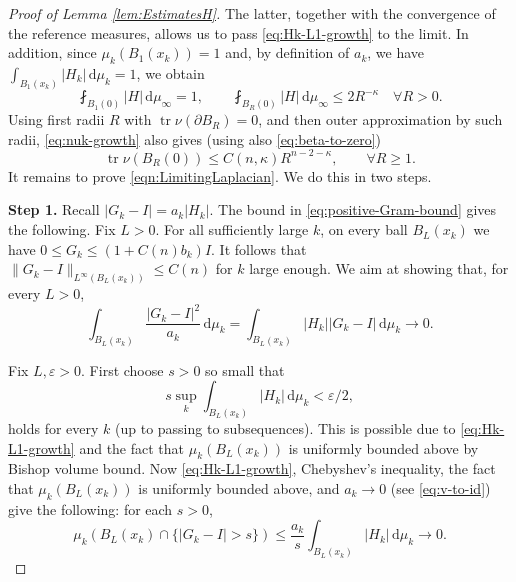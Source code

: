 \documentclass[12pt,a4paper,reqno]{amsart}
\renewcommand{\leq}{\leqslant}
\renewcommand{\geq}{\geqslant}
\renewcommand{\epsilon}{\varepsilon}
\newcommand{\tr}{\operatorname{tr}}
\begin{document}
\begin{proof}[Proof of Lemma \ref{lem:EstimatesH}]
The latter, together with the convergence of the reference measures, allows us to pass
\eqref{eq:Hk-L1-growth} to the limit. In addition, since
$\mu_k(B_1(x_k))=1$ and, by definition of $a_k$, we have
 $\int_{B_1(x_k)}|H_k|\,\mathrm{d}\mu_k=1$,
we obtain
\begin{equation}\label{eq:H-limit-growth}
 \fint_{B_1(0)}|H|\,\mathrm{d}\mu_\infty=1,
 \qquad
 \fint_{B_R(0)}|H|\,\mathrm{d}\mu_\infty\leq 2R^{-\kappa}
 \quad \forall R>0.
\end{equation}
Using first radii $R$ with $\tr\nu(\partial B_R)=0$, and then outer
approximation by such radii,
\eqref{eq:nuk-growth} also gives (using also \eqref{eq:beta-to-zero})
\begin{equation}\label{eq:nu-limit-growth}
 \tr\nu(B_R(0))\leq C(n,\kappa)R^{n-2-\kappa},
 \qquad\forall R\geq1.
\end{equation}
It remains to prove \eqref{eqn:LimitingLaplacian}. We do this in two steps.
\smallskip

\textbf{Step 1.} Recall $
|G_k-I|=a_k|H_k|$.
The bound in \eqref{eq:positive-Gram-bound} gives the following. Fix $L>0$. For all sufficiently large $k$, on every ball
$B_L(x_k)$ we have $
 0\leq G_k\leq(1+C(n)b_k)I$. 
It follows that $\|G_k-I\|_{L^\infty(B_L(x_k))}\leq C(n)$ for $k$ large enough. We aim at showing that, for every $L>0$,
\begin{equation}\label{eq:quadratic-remainderPre}
 \int_{B_L(x_k)}\frac{|G_k-I|^2}{a_k}\,\mathrm{d}\mu_k
 =\int_{B_L(x_k)}|H_k||G_k-I|\,\mathrm{d}\mu_k
 \to 0.
\end{equation}

Fix $L,\epsilon>0$.  
First choose $s>0$
so small that
\begin{equation}\label{eqn:varepsilon}
 s\sup_k\int_{B_L(x_k)}|H_k|\,\mathrm{d}\mu_k<\epsilon/2,
\end{equation}
holds for every $k$ (up to passing to subsequences). This is possible due to \eqref{eq:Hk-L1-growth} and the fact that $\mu_k(B_L(x_k))$ is uniformly bounded above by Bishop volume bound. Now \eqref{eq:Hk-L1-growth}, Chebyshev's inequality, the fact that $\mu_k(B_L(x_k))$ is uniformly bounded above, and $a_k\to 0$ (see \eqref{eq:v-to-id})
give the following: for each $s>0$,
\begin{equation}\label{eq:F-in-measure}
 \mu_k\left(B_L(x_k)\cap\{|G_k-I|>s\}\right)
 \leq\frac{a_k}{s}\int_{B_L(x_k)}|H_k|\,\mathrm{d}\mu_k
 \to 0.
\end{equation}


\end{proof}
\end{document}
